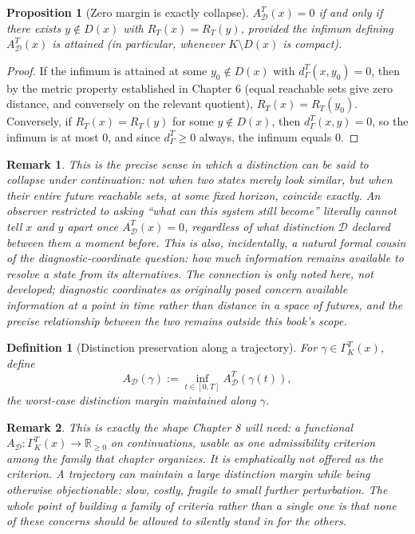 \documentclass[11pt]{report}
\newtheorem{proposition}{Proposition}[chapter]
\newtheorem{definition}{Definition}[chapter]
\newtheorem{remark}{Remark}[chapter]
\begin{document}
\begin{proposition}[Zero margin is exactly collapse]
$A_{\mathcal{D}}^T(x) = 0$ if and only if there exists $y \notin D(x)$
with $R_T(x) = R_T(y)$, provided the infimum defining $A_{\mathcal D}^T(x)$
is attained (in particular, whenever $K \setminus D(x)$ is compact).
\end{proposition}
\begin{proof}
If the infimum is attained at some $y_0 \notin D(x)$ with
$d_\Gamma^T(x,y_0) = 0$, then by the metric property established in
Chapter 6 (equal reachable sets give zero distance, and conversely on
the relevant quotient), $R_T(x) = R_T(y_0)$. Conversely, if
$R_T(x) = R_T(y)$ for some $y \notin D(x)$, then $d_\Gamma^T(x,y) = 0$,
so the infimum is at most $0$, and since $d_\Gamma^T \geq 0$ always,
the infimum equals $0$.
\end{proof}

\begin{remark}
This is the precise sense in which a distinction can be said to
collapse under continuation: not when two states merely look similar,
but when their entire future reachable sets, at some fixed horizon,
coincide exactly. An observer restricted to asking ``what can this
system still become'' literally cannot tell $x$ and $y$ apart once
$A_{\mathcal D}^T(x) = 0$, regardless of what distinction $\mathcal D$
declared between them a moment before. This is also, incidentally, a
natural formal cousin of the diagnostic-coordinate question: how
much information remains available to resolve a state from its
alternatives. The connection is only noted here, not
developed; diagnostic coordinates as originally posed concern
available information at a point in time rather than distance in a
space of futures, and the precise relationship between the two remains
outside this book's scope.
\end{remark}

\begin{definition}[Distinction preservation along a trajectory]
For $\gamma \in \Gamma_K^T(x)$, define
\[
A_{\mathcal D}(\gamma) := \inf_{t \in [0,T]} A_{\mathcal D}^T(\gamma(t)),
\]
the worst-case distinction margin maintained along $\gamma$.
\end{definition}

\begin{remark}
This is exactly the shape Chapter 8 will need: a functional
$A_{\mathcal D} : \Gamma_K^T(x) \to \mathbb{R}_{\geq 0}$ on
continuations, usable as one admissibility criterion among the family
that chapter organizes. It is emphatically not offered as the
criterion. A trajectory can maintain a large distinction margin while
being otherwise objectionable: slow, costly, fragile to small further
perturbation. The whole point of building a family of criteria
rather than a single one is that none of these concerns should be
allowed to silently stand in for the others.
\end{remark}
\end{document}
